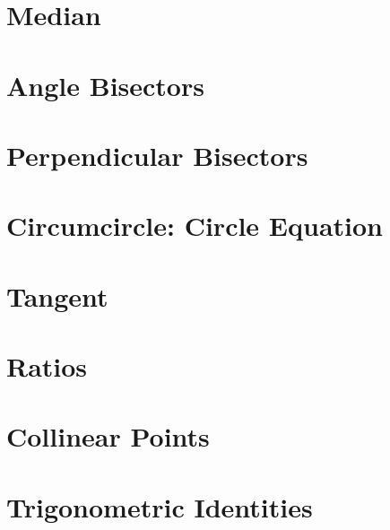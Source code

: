 \documentclass[journal]{IEEEtran}
\begin{document}
\section{Median}

\section{Angle Bisectors}

\section{Perpendicular Bisectors}

\section{Circumcircle: Circle Equation}

\section{Tangent}

%
\appendices
\section{Ratios}

\section{Collinear Points}

\section{Trigonometric Identities}

%
\end{document}
